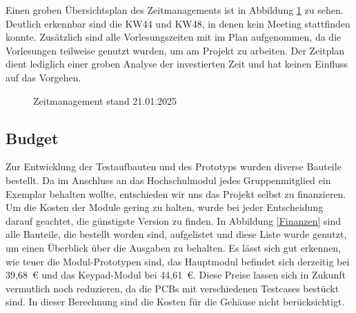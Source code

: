 
Einen groben Übersichtsplan des Zeitmanagements ist in Abbildung \ref{zeitplan} zu sehen. Deutlich erkennbar sind die KW44 und KW48, in denen kein Meeting stattfinden konnte. Zusätzlich sind alle Vorlesungszeiten mit im Plan aufgenommen, da die Vorlesungen teilweise genutzt wurden, um am Projekt zu arbeiten. Der Zeitplan dient lediglich einer groben Analyse der investierten Zeit und hat keinen Einfluss auf das Vorgehen.

\begin{figure}[H]
    \centering    
    \caption{Zeitmanagement stand 21.01.2025}
    \label{zeitplan}
\end{figure}


\subsection{Budget}
Zur Entwicklung der Testaufbauten und des Prototyps wurden diverse Bauteile bestellt. Da im Anschluss an das Hochschulmodul jedes Gruppenmitglied ein Exemplar behalten wollte, entschieden wir uns das Projekt selbst zu finanzieren. Um die Kosten der Module gering zu halten, wurde bei jeder Entscheidung darauf geachtet, die günstigste Version zu finden. In Abbildung \ref{Finanzen} sind alle Bauteile, die bestellt worden sind, aufgelistet und diese Liste wurde genutzt, um einen Überblick über die Ausgaben zu behalten. Es lässt sich gut erkennen, wie teuer die Modul-Prototypen sind, das Hauptmodul befindet sich derzeitig bei 39,68 € und das Keypad-Modul bei 44,61 €. Diese Preise lassen sich in Zukunft vermutlich noch reduzieren, da die PCBs mit verschiedenen Testcases bestückt sind. In dieser Berechnung sind die Kosten für die Gehäuse nicht berücksichtigt. 

